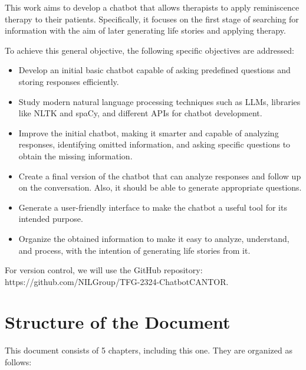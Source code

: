 This work aims to develop a chatbot that allows therapists to apply reminiscence therapy to their patients. Specifically, it focuses on the first stage of searching for information with the aim of later generating life stories and applying therapy.

To achieve this general objective, the following specific objectives are addressed:

\begin{itemize}
	\item Develop an initial basic chatbot capable of asking predefined questions and storing responses efficiently.
	\item Study modern natural language processing techniques such as LLMs, libraries like NLTK and spaCy, and different APIs for chatbot development.
	\item Improve the initial chatbot, making it smarter and capable of analyzing responses, identifying omitted information, and asking specific questions to obtain the missing information.
	\item Create a final version of the chatbot that can analyze responses and follow up on the conversation. Also, it should be able to generate appropriate questions.
	\item Generate a user-friendly interface to make the chatbot a useful tool for its intended purpose.
	\item Organize the obtained information to make it easy to analyze, understand, and process, with the intention of generating life stories from it.
\end{itemize}

For version control, we will use the GitHub repository: https://github.com/NILGroup/TFG-2324-ChatbotCANTOR.

\section{Structure of the Document}

This document consists of 5 chapters, including this one. They are organized as follows:

